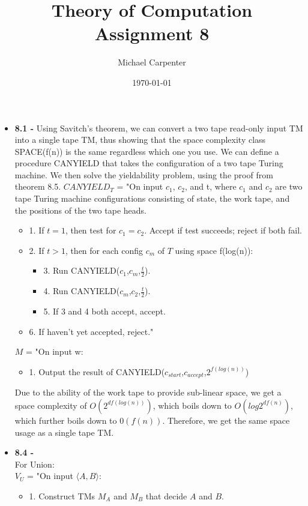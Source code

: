 \documentclass{article}
\title{Theory of Computation \\ Assignment 8}
\author{Michael Carpenter}
\date{\today}
\begin{document}
\maketitle

\begin{itemize}
  \item \textbf{8.1 - } Using Savitch's theorem, we can convert a two tape read-only input TM into a single tape TM, thus showing that the space complexity class SPACE(f(n)) is the same regardless which one you use. We can define a procedure CANYIELD that takes the configuration of a two tape Turing machine. We then solve the yieldability problem, using the proof from theorem 8.5.
    $CANYIELD_{T}$ = "On input $c_{1}$, $c_{2}$, and t, where $c_{1}$ and $c_{2}$ are two tape Turing machine configurations consisting of state, the work tape, and the positions of the two tape heads.
    \begin{itemize}
      \item 1. If $t = 1$, then test for $c_{1} = c_{2}$. Accept if test succeeds; reject if both fail.
      \item 2. If $t > 1$, then for each config $c_{m}$ of $T$ using space f(log(n)):
        \begin{itemize}
          \item 3. Run CANYIELD($c_{1}$,$c_{m}$,$\frac{t}{2}$).
          \item 4. Run CANYIELD($c_{m}$,$c_{2}$,$\frac{t}{2}$).
          \item 5. If 3 and 4 both accept, accept.
        \end{itemize}
      \item 6. If haven't yet accepted, reject."
    \end{itemize}
    $M$ = "On input w:
    \begin{itemize}
      \item 1. Output the result of CANYIELD($c_{start}$,$c_{accept}$,$2^{f(log(n))}$)
    \end{itemize}
    Due to the ability of the work tape to provide sub-linear space, we get a space complexity of $O(2^{df(log(n))})$, which boils down to $O(log2^{df(n)})$, which further boils down to $0(f(n))$. Therefore, we get the same space usage as a single tape TM.
  \item \textbf{8.4 - } \\
    For Union:\\
    $V_{U}$ = "On input $\langle A, B \rangle$:
    \begin{itemize}
      \item 1. Construct TMs $M_{A}$ and $M_{B}$ that decide $A$ and $B$.

\end{itemize}
\end{itemize}
\end{document}
